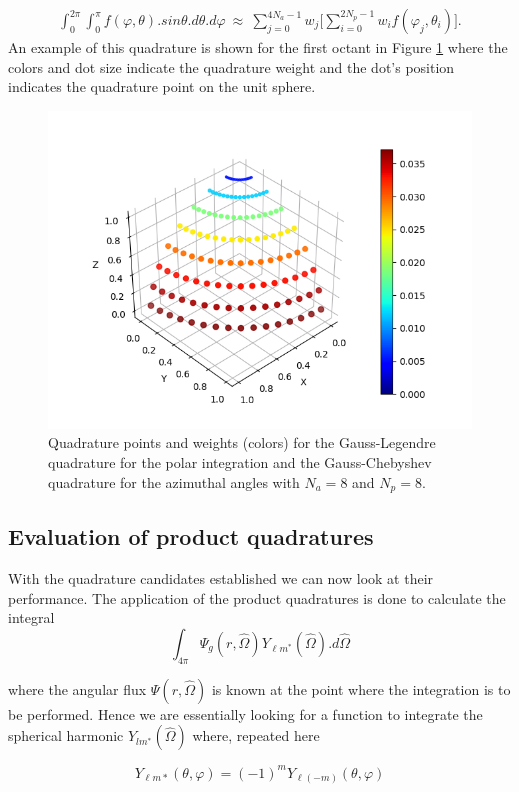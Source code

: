 \documentclass[11pt,letterpaper,titlepage]{article}
\newcommand{\beqn}{\begin{equation}
	\begin{aligned}}
\newcommand{\eeqn}{\end{aligned}
	\end{equation}}
\numberwithin{equation}{section}
\begin{document}
\begin{appendices}
\beqn
\int_0^{2\pi}\int_0^\pi f(\varphi,\theta).sin\theta.d\theta.d\varphi\ 
\approx \  \sum_{j=0}^{4N_a-1} w_j \biggr[
\sum_{i=0} ^{2N_p-1}   w_i f(\varphi_j,\theta_i)
\biggr].
\eeqn
\newline
An example of this quadrature is shown for the first octant in Figure \ref{fig:s8gausslegendrechebyshev} where the colors and dot size indicate the quadrature weight and the dot's position indicates the quadrature point on the unit sphere.
\begin{figure}[h]
\centering
\includegraphics[width=0.7\linewidth]{Gauss-Legendre-Chebyshev.png}
\caption{Quadrature points and weights (colors) for the Gauss-Legendre quadrature for the polar integration and the Gauss-Chebyshev quadrature for the azimuthal angles with $N_a=8$ and $N_p=8$.}
\label{fig:s8gausslegendrechebyshev}
\end{figure}


\newpage
\subsection{Evaluation of product quadratures}
With the quadrature candidates established we can now look at their performance. The application of the product quadratures is done to calculate the integral
\begin{equation*}
\int_{4\pi} \Psi_g(r,\hat{\Omega}) Y_{\ell m^*}(\hat{\Omega}).d\hat{\Omega} 
\end{equation*}

where the angular flux $\Psi(r,\hat{\Omega})$ is known at the point where the integration is to be performed. Hence we are essentially looking for a function to integrate the spherical harmonic $Y_{lm^*}(\hat{\Omega})$ where, repeated here

$$Y_{\ell m*}(\theta ,\varphi ) = (-1)^mY_{\ell (-m)}(\theta ,\varphi )$$


\end{appendices}
\end{document}

